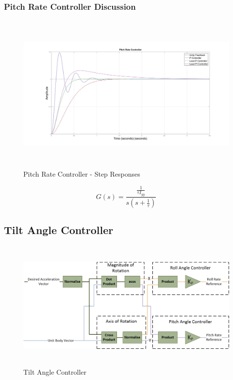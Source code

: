 		\subsubsection{Pitch Rate Controller Discussion}
		
		\begin{figure}[H]
			\centering
			\includegraphics[height = 8cm]{../Design/Matlab/Controllers/pitch_rate_step.jpg}
			\caption{Pitch Rate Controller -  Step Responses}
			\label{IM_PitchRateStep}
		\end{figure}
		
		
		
		\begin{equation}
		\label{EQ_PitchRateTF}
		G(s) = \frac{\frac{1}{\tau I_{yy}}}{s (s + \frac{1}{\tau})}
		\end{equation}
		
		
		\subsection{Tilt Angle Controller}
		\begin{figure}[H]
			\centering
			\includegraphics[height = 6.5cm]{../References/Diagrams/TiltAngleController.jpg}
			\caption{Tilt Angle Controller}
			\label{IM_TiltAngleController}
		\end{figure}
		
